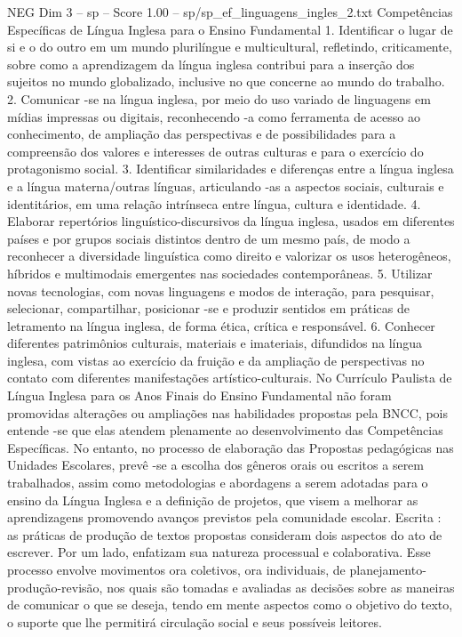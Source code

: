 \begin{textsample}{NEG Dim 3 – sp – Score 1.00 – sp/sp\_ef\_linguagens\_ingles\_2.txt}  \label{ex:f3_neg_085}
Competências Específicas de Língua Inglesa para o Ensino Fundamental 1.
Identificar o lugar de si e o do outro em um mundo plurilíngue e multicultural, refletindo, criticamente, sobre como a aprendizagem da língua inglesa contribui para a inserção dos sujeitos no mundo globalizado, inclusive no que concerne ao mundo do trabalho. 2.
Comunicar -se na língua inglesa, por meio do uso variado de linguagens em mídias impressas ou digitais, reconhecendo -a como ferramenta de acesso ao conhecimento, de ampliação das perspectivas e de possibilidades para a compreensão dos valores e interesses de outras culturas e para o exercício do protagonismo social. 3.
Identificar similaridades e diferenças entre a língua inglesa e a língua materna/outras línguas, articulando -as a aspectos sociais, culturais e identitários, em uma relação intrínseca entre língua, cultura e identidade. 4.
Elaborar repertórios linguístico-discursivos da língua inglesa, usados em diferentes países e por grupos sociais distintos dentro de um mesmo país, de modo a reconhecer a diversidade linguística como direito e valorizar os usos heterogêneos, híbridos e multimodais emergentes nas sociedades contemporâneas. 5.
Utilizar novas tecnologias, com novas linguagens e modos de interação, para pesquisar, selecionar, compartilhar, posicionar -se e produzir sentidos em práticas de letramento na língua inglesa, de forma ética, crítica e responsável. 6.
Conhecer diferentes patrimônios culturais, materiais e imateriais, difundidos na língua inglesa, com vistas ao exercício da fruição e da ampliação de perspectivas no contato com diferentes manifestações artístico-culturais.
No Currículo Paulista de Língua Inglesa para os Anos Finais do Ensino Fundamental não foram promovidas alterações ou ampliações nas habilidades propostas pela BNCC, pois entende -se que elas atendem plenamente ao desenvolvimento das Competências Específicas.
No entanto, no processo de elaboração das Propostas pedagógicas nas Unidades Escolares, prevê -se a escolha dos gêneros orais ou escritos a serem trabalhados, assim como metodologias e abordagens a serem adotadas para o ensino da Língua Inglesa e a definição de projetos, que visem a melhorar as aprendizagens promovendo avanços previstos pela comunidade escolar.
Escrita : as práticas de produção de textos propostas consideram dois aspectos do ato de escrever.
Por um lado, enfatizam sua natureza processual e colaborativa.
Esse processo envolve movimentos ora coletivos, ora individuais, de planejamento-produção-revisão, nos quais são tomadas e avaliadas as decisões sobre as maneiras de comunicar o que se deseja, tendo em mente aspectos como o objetivo do texto, o suporte que lhe permitirá circulação social e seus possíveis leitores.

\end{textsample}
